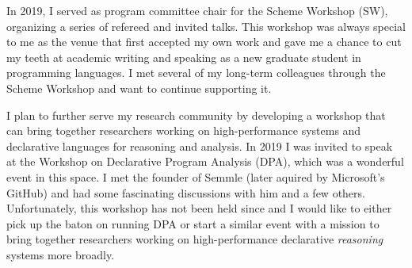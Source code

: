 \documentclass[12pt]{article}
\begin{document}
In 2019, I served as program committee chair for the Scheme Workshop (SW), organizing a series of refereed and invited talks. This workshop was always special to me as the venue that first accepted my own work and gave me a chance to cut my teeth at academic writing and speaking as a new graduate student in programming languages. I met several of my long-term colleagues through the Scheme Workshop and want to continue supporting it.

I plan to further serve my research community by developing a workshop that can bring together researchers working on high-performance systems and declarative languages for reasoning and analysis. In 2019 I was invited to speak at the Workshop on Declarative Program Analysis (DPA), which was a wonderful event in this space. I met the founder of Semmle (later aquired by Microsoft's GitHub) and had some fascinating discussions with him and a few others. Unfortunately, this workshop has not been held since and I would like to either pick up the baton on running DPA or start a similar event with a mission to bring together researchers working on high-performance declarative \emph{reasoning} systems more broadly.
\end{document}
